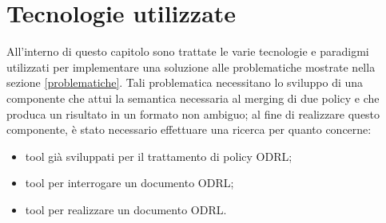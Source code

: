 \documentclass[12pt,a4paper,twoside]{book}
\begin{document}
\chapter{Tecnologie utilizzate}
All'interno di questo capitolo sono trattate le varie tecnologie e paradigmi utilizzati per implementare una soluzione alle problematiche mostrate nella sezione \ref{problematiche}. Tali problematica necessitano lo sviluppo di una componente che attui la semantica necessaria al merging di due policy e che produca un risultato in un formato non ambiguo; al fine di realizzare questo componente, è stato necessario effettuare una ricerca per quanto concerne:
\begin{itemize}
	\item tool già sviluppati per il trattamento di policy ODRL;
	\item tool per interrogare un documento ODRL;
	\item tool per realizzare un documento ODRL.
\end{itemize}
\end{document}
